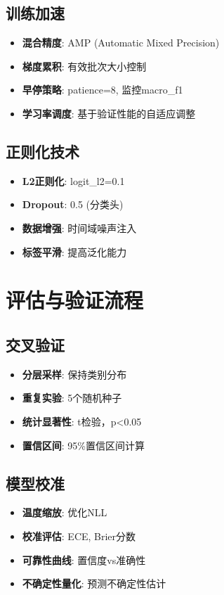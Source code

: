 \subsection{训练加速}
\begin{itemize}
    \item \textbf{混合精度}: AMP (Automatic Mixed Precision)
    \item \textbf{梯度累积}: 有效批次大小控制
    \item \textbf{早停策略}: patience=8, 监控macro\_f1
    \item \textbf{学习率调度}: 基于验证性能的自适应调整
\end{itemize}

\subsection{正则化技术}
\begin{itemize}
    \item \textbf{L2正则化}: logit\_l2=0.1
    \item \textbf{Dropout}: 0.5 (分类头)
    \item \textbf{数据增强}: 时间域噪声注入
    \item \textbf{标签平滑}: 提高泛化能力
\end{itemize}

\section{评估与验证流程}

\subsection{交叉验证}
\begin{itemize}
    \item \textbf{分层采样}: 保持类别分布
    \item \textbf{重复实验}: 5个随机种子
    \item \textbf{统计显著性}: t检验，p<0.05
    \item \textbf{置信区间}: 95\%置信区间计算
\end{itemize}

\subsection{模型校准}
\begin{itemize}
    \item \textbf{温度缩放}: 优化NLL
    \item \textbf{校准评估}: ECE, Brier分数
    \item \textbf{可靠性曲线}: 置信度vs准确性
    \item \textbf{不确定性量化}: 预测不确定性估计
\end{itemize}


